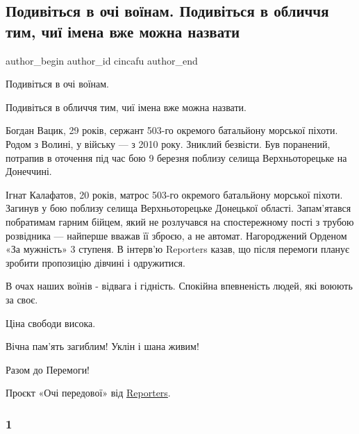  
 
 
 
 
 
\subsection{Подивіться в очі воїнам. Подивіться в обличчя тим, чиї імена вже можна назвати}
\label{sec:21_04_2022.fb.cincafu.1.voiny}
 
\ifcmt
 author_begin
   author_id cincafu
 author_end
\fi

Подивіться в очі воїнам. 

Подивіться в обличчя тим, чиї імена вже можна назвати. 

Богдан Вацик, 29 років, сержант 503-го окремого батальйону морської піхоти.
Родом з Волині, у війську — з 2010 року. Зниклий безвісти. Був поранений,
потрапив в оточення під час бою 9 березня поблизу селища Верхньоторецьке на
Донеччині.

Ігнат Калафатов, 20 років, матрос 503-го окремого батальйону морської піхоти.
Загинув у бою поблизу селища Верхньоторецьке Донецької області. Запам'ятався
побратимам гарним бійцем, який не розлучався на спостережному пості з трубою
розвідника — найперше вважав її зброєю, а не автомат. Нагороджений Орденом «За
мужність» 3 ступеня. В інтерв'ю Reporters казав, що після перемоги планує
зробити пропозицію дівчині і одружитися.

В очах наших воїнів - відвага і гідність. Спокійна впевненість людей, які
воюють за своє.

Ціна свободи висока. 

Вічна пам'ять загиблим! Уклін і шана живим! 

Разом до Перемоги!

Проєкт «Очі передової» від \href{https://www.facebook.com/reportersmedia/}{Reporters}.

\subsubsection{1}

